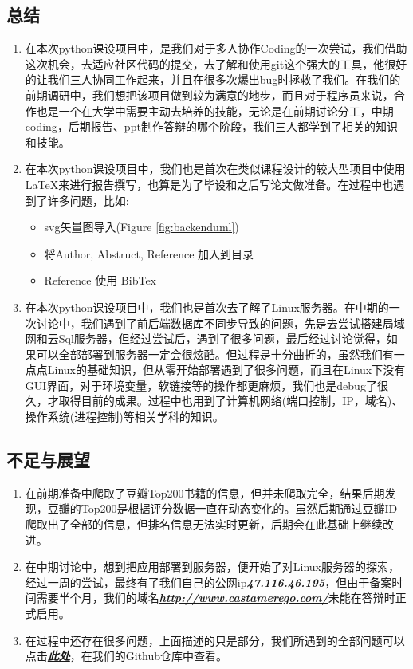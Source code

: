 \documentclass[twoside,11pt]{article}
\begin{document}
\subsection{总结}
\begin{enumerate}
    \item 在本次python课设项目中，是我们对于多人协作Coding的一次尝试，我们借助这次机会，去适应社区代码的提交，去了解和使用git这个强大的工具，他很好的让我们三人协同工作起来，并且在很多次爆出bug时拯救了我们。在我们的前期调研中，我们想把该项目做到较为满意的地步，而且对于程序员来说，合作也是一个在大学中需要主动去培养的技能，无论是在前期讨论分工，中期coding，后期报告、ppt制作答辩的哪个阶段，我们三人都学到了相关的知识和技能。
    \item 在本次python课设项目中，我们也是首次在类似课程设计的较大型项目中使用\LaTeX{}来进行报告撰写，也算是为了毕设和之后写论文做准备。在过程中也遇到了许多问题，比如:
          \begin{itemize}
              \item svg矢量图导入(Figure \ref{fig:backenduml})
              \item 将Author, Abstruct, Reference 加入到目录
              \item Reference 使用 BibTex
          \end{itemize}
    \item 在本次python课设项目中，我们也是首次去了解了Linux服务器。在中期的一次讨论中，我们遇到了前后端数据库不同步导致的问题，先是去尝试搭建局域网和云Sql服务器，但经过尝试后，遇到了很多问题，最后经过讨论觉得，如果可以全部部署到服务器一定会很炫酷。但过程是十分曲折的，虽然我们有一点点Linux的基础知识，但从零开始部署遇到了很多问题，而且在Linux下没有GUI界面，对于环境变量，软链接等的操作都更麻烦，我们也是debug了很久，才取得目前的成果。过程中也用到了计算机网络(端口控制，IP，域名)、操作系统(进程控制)等相关学科的知识。

\end{enumerate}
\subsection{不足与展望}

\begin{enumerate}
    \item 在前期准备中爬取了豆瓣Top200书籍的信息，但并未爬取完全，结果后期发现，豆瓣的Top200是根据评分数据一直在动态变化的。虽然后期通过豆瓣ID爬取出了全部的信息，但排名信息无法实时更新，后期会在此基础上继续改进。
    \item 在中期讨论中，想到把应用部署到服务器，便开始了对Linux服务器的探索，经过一周的尝试，最终有了我们自己的公网ip\href{http://47.116.46.195/}{\textbf{\emph{47.116.46.195}}}，但由于备案时间需要半个月，我们的域名\href{http://www.castamerego.com/}{\textbf{\emph{http://www.castamerego.com/}}}未能在答辩时正式启用。
    \item 在过程中还存在很多问题，上面描述的只是部分，我们所遇到的全部问题可以点击\href{https://github.com/Casta-mere/Read-Book/tree/main/record/bugs}{\textbf{\emph{此处}}}，在我们的Github仓库中查看。
\end{enumerate}


\end{document}
